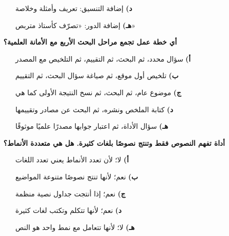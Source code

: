 \documentclass[11pt,a4paper]{article}
\begin{document}
\begin{multicols}{2}
\begin{minipage}{\linewidth}
\begin{itemize}[leftmargin=0.95cm, labelsep=4pt, itemsep=0pt, topsep=2pt, parsep=0pt]
  \item[\textbf{د)}] إضافة التنسيق: تعريف وأمثلة وخلاصة
  \item[\textbf{هـ)}] إضافة الدور: «تصرّف كأستاذ متربص»
\end{itemize}
\end{minipage}\par\vspace{7pt plus 4pt}
\noindent\begin{minipage}{\linewidth}
\hangindent=0.7cm\textbf{أي خطة عمل تجمع مراحل البحث الأربع مع الأمانة العلمية؟}
\begin{itemize}[leftmargin=0.95cm, labelsep=4pt, itemsep=0pt, topsep=2pt, parsep=0pt]
  \item[\textbf{أ)}] سؤال محدد، ثم البحث، ثم التقييم، ثم التلخيص مع المصدر
  \item[\textbf{ب)}] تلخيص أول موقع، ثم صياغة سؤال البحث، ثم التقييم
  \item[\textbf{ج)}] موضوع عام، ثم البحث، ثم نسخ النتيجة الأولى كما هي
  \item[\textbf{د)}] كتابة الملخص ونشره، ثم البحث عن مصادر وتقييمها
  \item[\textbf{هـ)}] سؤال الأداة، ثم اعتبار جوابها مصدرًا علميًا موثوقًا
\end{itemize}
\end{minipage}\par\vspace{7pt plus 4pt}
\noindent\begin{minipage}{\linewidth}
\hangindent=0.7cm\textbf{أداة تفهم النصوص فقط وتنتج نصوصًا بلغات كثيرة. هل هي متعددة الأنماط؟}
\begin{itemize}[leftmargin=0.95cm, labelsep=4pt, itemsep=0pt, topsep=2pt, parsep=0pt]
  \item[\textbf{أ)}] لا؛ لأن تعدد الأنماط يعني تعدد اللغات
  \item[\textbf{ب)}] نعم؛ لأنها تنتج نصوصًا متنوعة المواضيع
  \item[\textbf{ج)}] نعم؛ إذا أنتجت جداول نصية منظمة
  \item[\textbf{د)}] نعم؛ لأنها تتكلم وتكتب لغات كثيرة
  \item[\textbf{هـ)}] لا؛ لأنها تتعامل مع نمط واحد هو النص
\end{itemize}
\end{minipage}\par\vspace{7pt plus 4pt}
\end{multicols}
\end{document}
